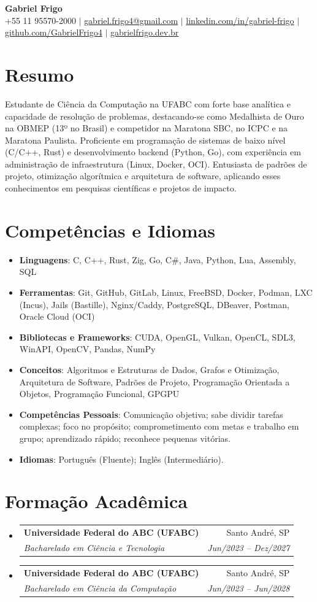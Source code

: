 \documentclass[letterpaper,10pt]{article}
\makeatletter
\newcommand{\resumeItem}[1]{\item\small{#1}}
\newcommand{\resumeSubheading}[4]{
\vspace{-1pt}\item
  \begin{tabular*}{0.97\textwidth}[t]{l@{\extracolsep{\fill}}r}
    \textbf{#1} & #2 \\
    \textit{#3} & \textit{#4} \\
  \end{tabular*}\vspace{-7pt}
}
\newcommand{\resumeSubHeadingList}{\begin{itemize}[leftmargin=0.15in, label={}]}
\newcommand{\resumeSubHeadingListEnd}{\end{itemize}}
\makeatother
\begin{document}
\begin{center}
  \textbf{\Huge Gabriel Frigo} \\
  \small +55 11 95570-2000 $|$ \href{mailto:gabriel.frigo4@gmail.com}{gabriel.frigo4@gmail.com} $|$
  \href{https://linkedin.com/in/gabriel-frigo-b6727b275/}{linkedin.com/in/gabriel-frigo} $|$
  \href{https://github.com/GabrielFrigo4}{github.com/GabrielFrigo4} $|$
  \href{https://gabrielfrigo.dev.br}{gabrielfrigo.dev.br}
\end{center}

\section{Resumo}
Estudante de Ciência da Computação na UFABC com forte base analítica e capacidade de resolução de problemas, destacando-se como Medalhista de Ouro na OBMEP (13º no Brasil) e competidor na Maratona SBC, no ICPC e na Maratona Paulista. Proficiente em programação de sistemas de baixo nível (C/C++, Rust) e desenvolvimento backend (Python, Go), com experiência em administração de infraestrutura (Linux, Docker, OCI). Entusiasta de padrões de projeto, otimização algorítmica e arquitetura de software, aplicando esses conhecimentos em pesquisas científicas e projetos de impacto.

\section{Competências e Idiomas}
\resumeSubHeadingList
  \resumeItem{\textbf{Linguagens}: C, C++, Rust, Zig, Go, C\#, Java, Python, Lua, Assembly, SQL}
  \resumeItem{\textbf{Ferramentas}: Git, GitHub, GitLab, Linux, FreeBSD, Docker, Podman, LXC (Incus), Jails (Bastille), Nginx/Caddy, PostgreSQL, DBeaver, Postman, Oracle Cloud (OCI)}
  \resumeItem{\textbf{Bibliotecas e Frameworks}: CUDA, OpenGL, Vulkan, OpenCL, SDL3, WinAPI, OpenCV, Pandas, NumPy}
  \resumeItem{\textbf{Conceitos}: Algoritmos e Estruturas de Dados, Grafos e Otimização, Arquitetura de Software, Padrões de Projeto, Programação Orientada a Objetos, Programação Funcional, GPGPU}
  \resumeItem{\textbf{Competências Pessoais}: Comunicação objetiva; sabe dividir tarefas complexas; foco no propósito; comprometimento com metas e trabalho em grupo; aprendizado rápido; reconhece pequenas vitórias.}
  \resumeItem{\textbf{Idiomas}: Português (Fluente); Inglês (Intermediário).}
\resumeSubHeadingListEnd

\section{Formação Acadêmica}
\resumeSubHeadingList
  \resumeSubheading
    {Universidade Federal do ABC (UFABC)}{Santo André, SP}
    {Bacharelado em Ciência e Tecnologia}{Jun/2023 -- Dez/2027}
  \resumeSubheading
    {Universidade Federal do ABC (UFABC)}{Santo André, SP}
    {Bacharelado em Ciência da Computação}{Jun/2023 -- Jun/2028}
\resumeSubHeadingListEnd
\end{document}
